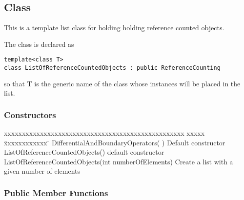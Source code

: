 

\subsection{Class \LORCO}

This is a template list class for holding holding 
reference counted objects.

The class is declared as
\begin{verbatim}
template<class T>
class ListOfReferenceCountedObjects : public ReferenceCounting
\end{verbatim}
so that {\ff T} is the generic name of the class whose instances
will be placed in the list.

\subsubsection{Constructors}

\begin{tabbing}
{\ff xxxxxxxxxxxxxxxxxxxxxxxxxxxxxxxxxxxxxxxxxxxxxxxxxx} xxxxx \= xxxxxxxxxxxx \=  \kill
{\ff DifferentialAndBoundaryOperators( )} \> Default constructor \\
{\ff ListOfReferenceCountedObjects()}  \> default constructor \\
{\ff ListOfReferenceCountedObjects(int numberOfElements)} \> Create a list with a given number of elements \\
\end{tabbing}

\subsubsection{Public Member Functions}


